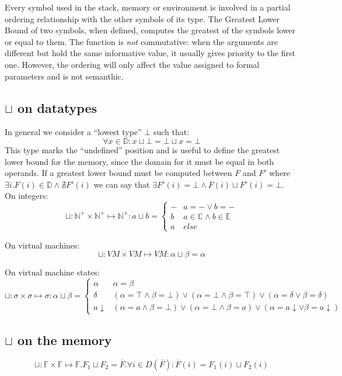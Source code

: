 \documentclass{amsart}
\newcommand{\N}{\mathbb{N}}
\newcommand{\E}{\mathbb{E}}
\newcommand{\C}{\mathbb{C}}
\newcommand{\bF}{\mathbb{F}}
\newcommand{\data}{\mathbb{D}}
\newcommand{\down}[1]{#1\downarrow}
\newcommand{\Int}{\N^+}
\numberwithin{equation}{section}
\theoremstyle{plain} %
\theoremstyle{definition}
\theoremstyle{remark}
\begin{document}
Every symbol used in the stack, memory or environment is involved in a partial ordering relationship with the other symbols of its type. The Greatest Lower Bound of two symbols, when defined, computes the greatest of the symbols lower or equal to them. The function is \emph{not} commutative: when the arguments are different but hold the same informative value, it usually gives priority to the first one. However, the ordering will only affect the value assigned to formal parameters and is not semanthic.

\subsection{$\sqcup$ on datatypes}
In general we consider a ``lowest type'' $\bot$ such that:
\[ \forall x \in \data{}: x \sqcup \bot = \bot \sqcup x = \bot \]
This type marks the ``undefined'' position and is useful to define the greatest lower bound for the memory, since the domain for it must be equal in both operands. If a greatest lower bound must be computed between $F$ and $F'$ where $\exists i. F(i) \in \data{} \wedge \nexists F'(i)$ we can say that $\exists F'(i) = \bot \wedge F(i) \sqcup F'(i) = \bot$.\\


On integers:
\[ \sqcup: \Int{} \times \Int{} \mapsto \Int{}: a \sqcup b =
\begin{cases}
- & a = - \vee b = -\\
b & a \in \C{} \wedge b \in \E{} \\
a & else
\end{cases} \]

On virtual machines:
\[ \sqcup: VM \times VM \mapsto VM: \alpha \sqcup \beta = \alpha\]

On virtual machine states:
\[ \sqcup: \sigma \times \sigma \mapsto \sigma: \alpha \sqcup \beta =
\begin{cases}
\alpha & \alpha = \beta\\
\delta & (\alpha = \top \wedge \beta = \bot) \vee (\alpha = \bot \wedge \beta = \top) \vee (\alpha = \delta \vee \beta = \delta)\\
\down{a} & (\alpha = a \wedge \beta = \bot) \vee (\alpha = \bot \wedge \beta = a) \vee (\alpha = \down{a} \vee \beta = \down{a})
\end{cases} \]

\subsection{$\sqcup$ on the memory}
\[\sqcup: \bF{} \times \bF{} \mapsto \bF{}. F_1 \sqcup F_2 = \overline{F}.\forall i \in D(\overline{F}): \overline{F}(i) = F_1(i) \sqcup F_2(i)\]
\end{document}
